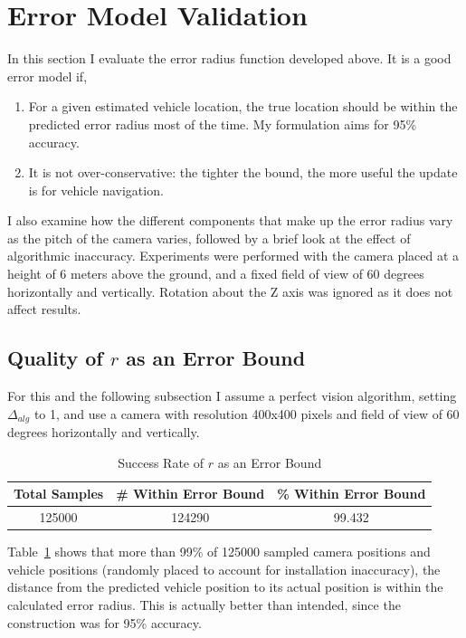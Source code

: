 \documentclass[a4paper,12pt,twoside,openright]{report}
\begin{document}
\section{Error Model Validation}
\label{sec:camera:validation}

In this section I evaluate the error radius function developed above. It is a good error model if,

\begin{enumerate}
    \item For a given estimated vehicle location, the true location should be within the predicted
          error radius most of the time. My formulation aims for 95\% accuracy.
    \item It is not over-conservative: the tighter the bound, the more useful the update is
          for vehicle navigation.
\end{enumerate}

I also examine how the different components that make up the error radius vary
as the pitch of the camera varies, followed by a brief look at the
effect of algorithmic inaccuracy. Experiments were performed
with the camera placed at a height of 6 meters above the ground, and a fixed
field of view of 60 degrees horizontally and vertically. Rotation about the Z axis
was ignored as it does not affect results.

\subsection{Quality of $r$ as an Error Bound}

For this and the following subsection I assume a perfect vision algorithm,
setting $\Delta_{alg}$ to 1, and use a camera with resolution 400x400 pixels and
field of view of 60 degrees horizontally and vertically.

\begin{table}[htb]
    \centering
    \caption[$r$ as an Error Bound]{Success Rate of $r$ as an Error Bound}
    \label{tab:camera:bound accuracy}
    \begin{tabular}{@{}ccc@{}}
        \toprule
        Total Samples & \# Within Error Bound & \% Within Error Bound \\ \midrule
        125000              & 124290                  & 99.432 
    \end{tabular}
\end{table}

Table~\ref{tab:camera:bound accuracy} shows that more than 99\% of 125000 sampled camera positions
and vehicle positions (randomly placed to account for installation inaccuracy), the distance from the predicted vehicle position to 
its actual position is within the calculated error radius. This
is actually better than intended, since the construction was for 95\% accuracy.
\end{document}
